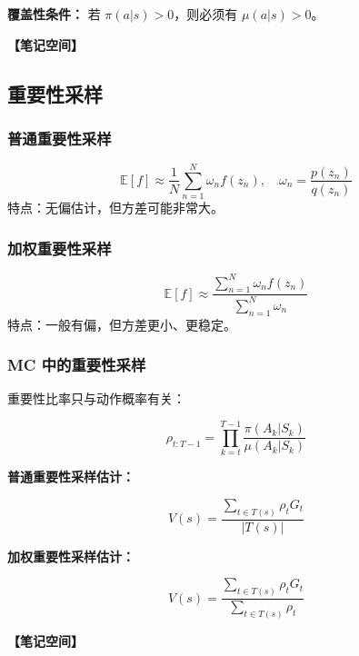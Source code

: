 \documentclass[12pt,a4paper]{article}
\newcommand{\notespace}[1][3cm]{%
  \vspace{#1}%
  \noindent\textbf{【笔记空间】}%
  \vspace{#1}%
}
\newcommand{\E}{\mathbb{E}}
\newcommand{\1}{\mathbf{1}}
\begin{document}
\textbf{覆盖性条件：} 若 $\pi(a|s)>0$，则必须有 $\mu(a|s)>0$。

\notespace[2cm]

\subsection{重要性采样}

\subsubsection*{普通重要性采样}

\begin{equation}
\E[f]\approx \frac{1}{N}\sum_{n=1}^{N}\omega_n f(z_n), \quad \omega_n=\frac{p(z_n)}{q(z_n)}
\end{equation}
特点：无偏估计，但方差可能非常大。

\subsubsection*{加权重要性采样}

\begin{equation}
\E[f]\approx \frac{\sum_{n=1}^{N}\omega_n f(z_n)}{\sum_{n=1}^{N}\omega_n}
\end{equation}
特点：一般有偏，但方差更小、更稳定。

\subsubsection*{MC 中的重要性采样}

重要性比率只与动作概率有关：

\begin{equation}
\rho_{t:T-1} =\prod_{k=t}^{T-1}\frac{\pi(A_k|S_k)}{\mu(A_k|S_k)}
\end{equation}

\textbf{普通重要性采样估计：}

\begin{equation}
V(s)=\frac{\sum_{t\in T(s)} \rho_t G_t}{|T(s)|}
\end{equation}

\textbf{加权重要性采样估计：}

\begin{equation}
V(s)=\frac{\sum_{t\in T(s)} \rho_t G_t}{\sum_{t\in T(s)} \rho_t}
\end{equation}

\notespace[3cm]

\newpage

\end{document}
